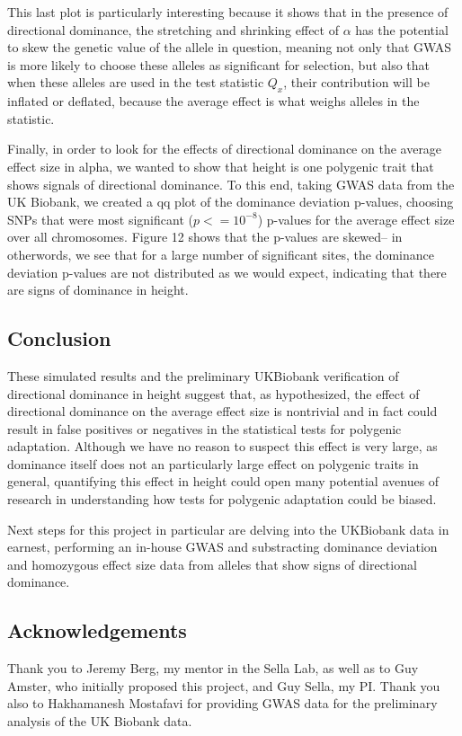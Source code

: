\documentclass[a4paper,12pt]{article}
\begin{document}
This last plot is particularly interesting because it shows that in
the presence of directional dominance, the stretching and shrinking
effect of $\alpha$ has the potential to skew the genetic value of the
allele in question, meaning not only that GWAS is more likely to
choose these alleles as significant for selection, but also that when
these alleles are used in the test statistic $Q_x$, their contribution
will be inflated or deflated, because the average effect is what
weighs alleles in the statistic.

Finally, in order to look for the effects of directional dominance on
the average effect size in alpha, we wanted to show that height is one
polygenic trait that shows signals of directional dominance. To this
end, taking GWAS data from the UK Biobank, we created a qq plot of the
dominance deviation p-values, choosing SNPs that were 
most significant ($p <= 10^{-8}$) p-values for the average effect size
over all chromosomes. Figure 12 shows that the p-values are skewed--
in otherwords, we see that for a large number of significant sites,
the dominance deviation p-values are not distributed as we would
expect, indicating that there are signs of dominance in height. 

\subsection*{Conclusion}
These simulated results and the preliminary UKBiobank verification of
directional dominance in height suggest that, as hypothesized, the
effect of directional dominance on the average effect size is
nontrivial and in fact could result in false positives or negatives in
the statistical tests for polygenic adaptation. Although we have no
reason to suspect this effect is very large, as dominance
itself does not an particularly large effect on polygenic traits in
general, quantifying this effect in height could open many potential
avenues of research in understanding how tests for polygenic
adaptation could be biased.

Next steps for this project in particular are delving into the
UKBiobank data in earnest, performing an in-house GWAS and
substracting dominance deviation and homozygous effect size data from
alleles that show signs of directional dominance.

\subsection*{Acknowledgements}
Thank you to Jeremy Berg, my mentor in the Sella Lab, as well as to
Guy Amster, who initially proposed this project, and Guy Sella, my
PI. Thank you also to Hakhamanesh Mostafavi for providing GWAS data
for the preliminary analysis of the UK Biobank data. 
\end{document}
